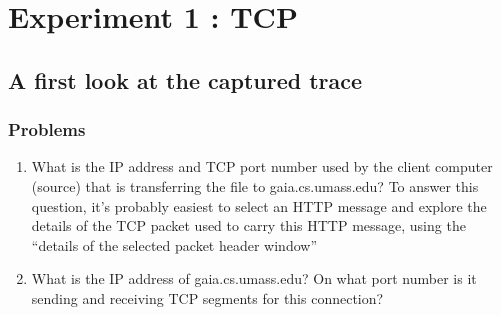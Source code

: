 \section{Experiment 1 : TCP}
\subsection{A first look at the captured trace}
    \subsubsection*{Problems}
    \begin{enumerate}[label=\bfseries Problem \arabic*:,leftmargin=*,labelindent=1em]
        \item What is the IP address and TCP port number used by the client computer (source) that is transferring the file to gaia.cs.umass.edu? 
        To answer this question, it’s probably easiest to select an HTTP message and explore the details of the TCP packet used to carry this HTTP message,
        using the “details of the selected packet header window”\\[0.2mm]
        \soln
        \item What is the IP address of gaia.cs.umass.edu? On what port number is it sending and receiving TCP segments for this connection?\\[0.2mm]
        \soln
    \end{enumerate}
\newpage